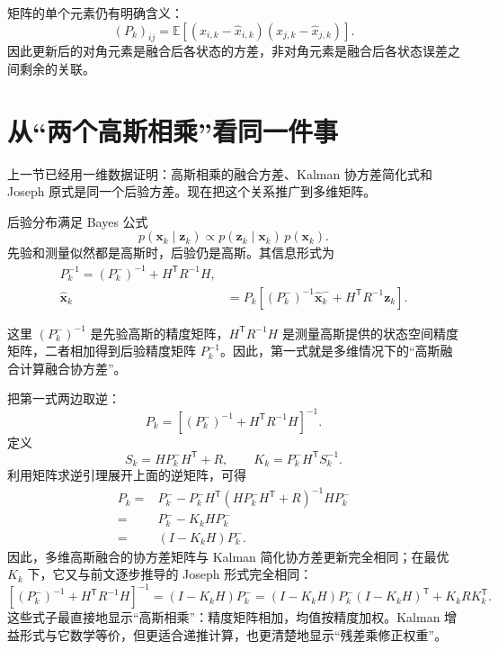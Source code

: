 \documentclass[UTF8,a4paper,11pt]{ctexart}
\newcommand{\prior}{^{-}}
\newcommand{\transpose}{^{\mathsf T}}
\begin{document}
矩阵的单个元素仍有明确含义：
\begin{equation}
(P_k)_{ij}
=\mathbb E[(x_{i,k}-\hat x_{i,k})(x_{j,k}-\hat x_{j,k})].
\end{equation}
因此更新后的对角元素是融合后各状态的方差，非对角元素是融合后各状态误差之间剩余的关联。

\section{从“两个高斯相乘”看同一件事}
\label{sec:gaussian-product}

上一节已经用一维数据证明：高斯相乘的融合方差、Kalman 协方差简化式和 Joseph 原式是同一个后验方差。现在把这个关系推广到多维矩阵。

后验分布满足 Bayes 公式
\begin{equation}
p(\bm x_k\mid\bm z_k)
\propto
p(\bm z_k\mid\bm x_k)\,p(\bm x_k).
\end{equation}
先验和测量似然都是高斯时，后验仍是高斯。其信息形式为
\begin{align}
\boxed{P_k^{-1}
=(P_k\prior)^{-1}+H\transpose R^{-1}H},\\
\hat{\bm x}_k
&=P_k\left[(P_k\prior)^{-1}\hat{\bm x}_k\prior
+H\transpose R^{-1}\bm z_k\right].
\end{align}

这里 $(P_k\prior)^{-1}$ 是先验高斯的精度矩阵，$H\transpose R^{-1}H$ 是测量高斯提供的状态空间精度矩阵，二者相加得到后验精度矩阵 $P_k^{-1}$。因此，第一式就是多维情况下的“高斯融合计算融合协方差”。

把第一式两边取逆：
\begin{equation}
P_k
=\left[(P_k\prior)^{-1}+H\transpose R^{-1}H\right]^{-1}.
\end{equation}
定义
\begin{equation}
S_k=HP_k\prior H\transpose+R,
\qquad
K_k=P_k\prior H\transpose S_k^{-1}.
\end{equation}
利用矩阵求逆引理展开上面的逆矩阵，可得
\begin{align}
P_k
={}&P_k\prior
-P_k\prior H\transpose
(HP_k\prior H\transpose+R)^{-1}
HP_k\prior\\
={}&P_k\prior-K_kHP_k\prior\\
={}&(I-K_kH)P_k\prior.
\end{align}
因此，多维高斯融合的协方差矩阵与 Kalman 简化协方差更新完全相同；在最优 $K_k$ 下，它又与前文逐步推导的 Joseph 形式完全相同：
\begin{equation}
\boxed{
\left[(P_k\prior)^{-1}+H\transpose R^{-1}H\right]^{-1}
=(I-K_kH)P_k\prior
=(I-K_kH)P_k\prior(I-K_kH)\transpose
+K_kRK_k\transpose
}.
\end{equation}
这些式子最直接地显示“高斯相乘”：精度矩阵相加，均值按精度加权。Kalman 增益形式与它数学等价，但更适合递推计算，也更清楚地显示“残差乘修正权重”。
\end{document}
